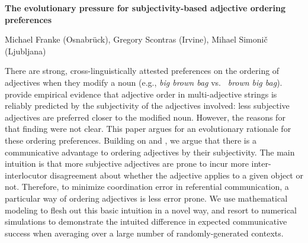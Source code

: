 \documentclass[12pt]{article}
\begin{document}
\setlength{\abovedisplayskip}{0.5pt}
\setlength{\belowdisplayskip}{0.5pt}


\begin{center}
	\textbf{The evolutionary pressure for subjectivity-based adjective ordering preferences}
  \vspace*{-0.4cm}
  \begin{flushright}
  {\footnotesize Michael Franke (Osnabr\"uck), Gregory Scontras (Irvine), Mihael Simoni\v{c} (Ljubljana)}
\end{flushright}
\end{center}

\vspace{-5pt}

\noindent 
There are strong, cross-linguistically attested preferences on the ordering of adjectives when
they modify a noun (e.g., \emph{big brown bag} vs.~ \emph{brown big bag}).
\cite{scontrasetal2017adjectives} provide empirical evidence that adjective order in
multi-adjective strings is reliably predicted by the subjectivity of the adjectives involved:
less subjective adjectives are preferred closer to the modified noun. However, the reasons for that
finding were not clear. This paper argues for an evolutionary rationale for these ordering
preferences. Building on \cite{scontrasetalSPadjectives} and \cite{simonic2018}, we argue that
there is a communicative advantage to ordering adjectives by their subjectivity. The main
intuition is that more subjective adjectives are prone to incur more inter-interlocutor
disagreement about whether the adjective applies to a given object or not. Therefore, to
minimize coordination error in referential communication, a particular way of ordering
adjectives is less error prone. We use mathematical modeling to flesh out this basic intuition
in a novel way, and resort to numerical simulations to demonstrate the intuited difference in
expected communicative success when averaging over a large number of randomly-generated
contexts.
\end{document}
